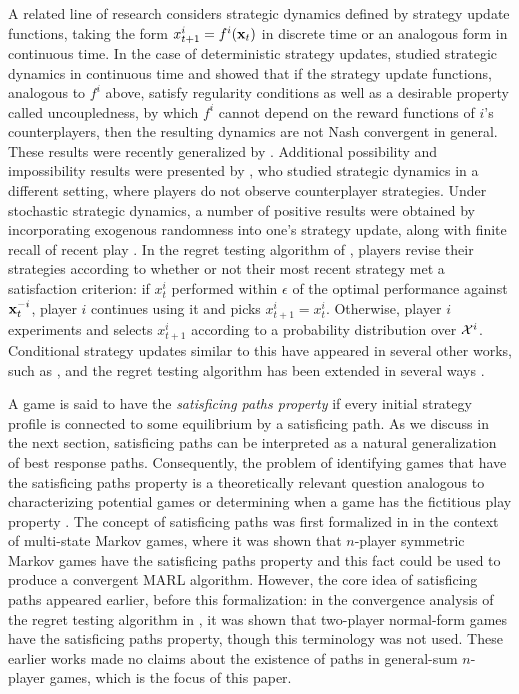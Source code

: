 A related line of research considers strategic dynamics defined by strategy update functions, taking the form $x^i_{t+1} = f^i ( {\mathbf{x}}_t )$ in discrete time or an analogous form in continuous time. %
In the case of deterministic strategy updates, \cite{hart2003uncoupled} studied strategic dynamics in continuous time and showed that if the strategy update functions, analogous to $f^i$ above, satisfy regularity conditions as well as a desirable property called uncoupledness, by which $f^i$ cannot depend on the reward functions of $i$'s counterplayers, then the resulting dynamics are not Nash convergent in general. These results were recently generalized by \cite{milionis2023impossibility}. Additional possibility and impossibility results were presented by \cite{babichenko2012completely}, who studied strategic dynamics in a different setting, where players do not observe counterplayer strategies. Under stochastic strategic dynamics, a number of positive results were obtained by incorporating exogenous randomness into one's strategy update, along with finite recall of recent play \cite{hart2006stochastic,foster2006regret,germano2007global}. In the regret testing algorithm of \cite{foster2006regret}, players revise their strategies according to whether or not their most recent strategy met a satisfaction criterion: if $x^i_t$ performed within $\epsilon$ of the optimal performance against ${\mathbf{x}}^{-i}_t$, player $i$ continues using it and picks $x^i_{t+1} = x^i_t$. Otherwise, player $i$ experiments and selects $x^i_{t+1}$ according to a probability distribution over $\mathcal{X}^i$. Conditional strategy updates similar to this have appeared in several other works, such as \cite{chien2011convergence,candogan2013near,chasparis2013aspiration}, and the regret testing algorithm has been extended in several ways \cite{germano2007global,arslan2017decentralized}. 


A game is said to have the \emph{satisficing paths property} if every initial strategy profile is connected to some equilibrium by a satisficing path. As we discuss in the next section, satisficing paths can be interpreted as a natural generalization of best response paths. Consequently, the problem of identifying games that have the satisficing paths property is a theoretically relevant question analogous to characterizing potential games \cite{monderer1996potential} or determining when a game has the fictitious play property \cite{monderer1996a,monderer1996fictitious}. The concept of satisficing paths was first formalized in \cite{yongacoglu2023satisficing} in the context of multi-state Markov games, where it was shown that $n$-player symmetric Markov games have the satisficing paths property and this fact could be used to produce a convergent MARL algorithm. However, the core idea of satisficing paths appeared earlier, before this formalization: in the convergence analysis of the regret testing algorithm in \cite{foster2006regret}, it was shown that two-player normal-form games have the satisficing paths property, though this terminology was not used. These earlier works made no claims about the existence of paths in general-sum $n$-player games, which is the focus of this paper. 